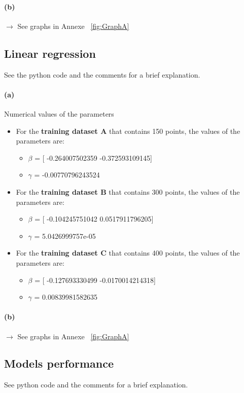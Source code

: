 \documentclass[11pt]{article}
\numberwithin{figure}{section} %
\begin{document}
\paragraph{(b)}
$\rightarrow$ See graphs in Annexe ~\ref{fig:GraphA}


\subsection{Linear regression}
See the python code and the comments for a brief explanation.

\paragraph{(a)} Numerical values of the parameters
\begin{itemize}
\item For the \textbf{training dataset A} that contains 150 points, the values of the parameters are:
	\begin{itemize}
		\item $\beta$ = [ -0.264007502359 -0.372593109145]
		\item $\gamma$ = -0.00770796243524
	\end{itemize}

\item For the \textbf{training dataset B} that contains 300 points, the values of the parameters are:
	\begin{itemize}
		\item $\beta$ = [ -0.104245751042 0.0517911796205]
		\item $\gamma$ = 5.0426999757e-05
	\end{itemize}

\item For the \textbf{training dataset C} that contains 400 points, the values of the parameters are:
	\begin{itemize}
		\item $\beta$ = [ -0.127693330499 -0.0170014214318]
		\item $\gamma$ = 0.00839981582635
	\end{itemize}
\end{itemize}

\paragraph{(b)}
$\rightarrow$ See graphs in Annexe ~\ref{fig:GraphA}

\subsection{Models performance}
See python code and the comments for a brief explanation.
\end{document}
